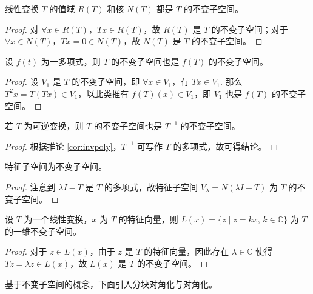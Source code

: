 \begin{property}
线性变换 $T$ 的值域 $R(T)$ 和核 $N(T)$ 都是 $T$ 的不变子空间。
\end{property}
\begin{proof}
对 $\forall x\in R(T)$，$Tx\in R(T)$，故 $R(T)$ 是 $T$ 的不变子空间；对于 $\forall x\in N(T)$，$Tx=0\in N(T)$，故 $N(T)$ 是 $T$ 的不变子空间。
\end{proof}

\begin{property}
设 $f(t)$ 为一多项式，则 $T$ 的不变子空间也是 $f(T)$ 的不变子空间。
\end{property}
\begin{proof}
设 $V_1$ 是 $T$ 的不变子空间，即 $\forall x\in V_1$，有 $Tx\in V_1$.  那么 $T^2x=T(Tx)\in V_1$，以此类推有 $f(T)(x)\in V_1$，即 $V_1$ 也是 $f(T)$ 的不变子空间。
\end{proof}

\begin{corollary}
若 $T$ 为可逆变换，则 $T$ 的不变子空间也是 $T^{-1}$ 的不变子空间。
\end{corollary}
\begin{proof}
根据推论 \ref{cor:invpoly}，$T^{-1}$ 可写作 $T$ 的多项式，故可得结论。
\end{proof}

\begin{corollary}
特征子空间为不变子空间。
\end{corollary}
\begin{proof}
注意到 $\lambda I-T$ 是 $T$ 的多项式，故特征子空间 $V_\lambda=N(\lambda I-T)$ 为 $T$ 的不变子空间。
\end{proof}

\begin{theorem}
设 $T$ 为一个线性变换，$x$ 为 $T$ 的特征向量，则 $L(x)=\{z\mid z=kx,\,k\in \mathbb C\}$ 为 $T$ 的一维不变子空间。
\end{theorem}
\begin{proof}
对于 $z\in L(x)$，由于 $z$ 是 $T$ 的特征向量，因此存在 $\lambda\in\mathbb C$ 使得 $Tz=\lambda z\in L(x)$，故 $L(x)$ 是 $T$ 的不变子空间。
\end{proof}

基于不变子空间的概念，下面引入分块对角化与对角化。

